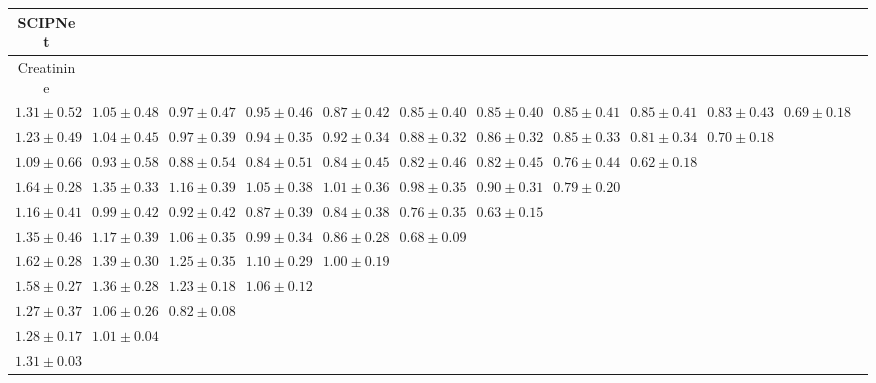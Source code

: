 \begin{table}[ht]
{{\begin{adjustbox}{width=\textwidth}
\begin{tabular}{cccccccccccc}
SCIPNet&  &  &  &  &  &  &  &  &  & \\
\hline
Creatinine &  &  &  &  &  &  &  &  &  & \\
\hline
$1.31 \pm 0.52$ & $1.05 \pm 0.48$ & $0.97 \pm 0.47$ & $0.95 \pm 0.46$ & $0.87 \pm 0.42$ & $0.85 \pm 0.40$ & $0.85 \pm 0.40$ & $0.85 \pm 0.41$ & $0.85 \pm 0.41$ & $0.83 \pm 0.43$ & $0.69 \pm 0.18$ &  \\
$1.23 \pm 0.49$ & $1.04 \pm 0.45$ & $0.97 \pm 0.39$ & $0.94 \pm 0.35$ & $0.92 \pm 0.34$ & $0.88 \pm 0.32$ & $0.86 \pm 0.32$ & $0.85 \pm 0.33$ & $0.81 \pm 0.34$ & $0.70 \pm 0.18$ &  &  \\
$1.09 \pm 0.66$ & $0.93 \pm 0.58$ & $0.88 \pm 0.54$ & $0.84 \pm 0.51$ & $0.84 \pm 0.45$ & $0.82 \pm 0.46$ & $0.82 \pm 0.45$ & $0.76 \pm 0.44$ & $0.62 \pm 0.18$ &  &  &  \\
$1.64 \pm 0.28$ & $1.35 \pm 0.33$ & $1.16 \pm 0.39$ & $1.05 \pm 0.38$ & $1.01 \pm 0.36$ & $0.98 \pm 0.35$ & $0.90 \pm 0.31$ & $0.79 \pm 0.20$ &  &  &  &  \\
$1.16 \pm 0.41$ & $0.99 \pm 0.42$ & $0.92 \pm 0.42$ & $0.87 \pm 0.39$ & $0.84 \pm 0.38$ & $0.76 \pm 0.35$ & $0.63 \pm 0.15$ &  &  &  &  &  \\
$1.35 \pm 0.46$ & $1.17 \pm 0.39$ & $1.06 \pm 0.35$ & $0.99 \pm 0.34$ & $0.86 \pm 0.28$ & $0.68 \pm 0.09$ &  &  &  &  &  &  \\
$1.62 \pm 0.28$ & $1.39 \pm 0.30$ & $1.25 \pm 0.35$ & $1.10 \pm 0.29$ & $1.00 \pm 0.19$ &  &  &  &  &  &  &  \\
$1.58 \pm 0.27$ & $1.36 \pm 0.28$ & $1.23 \pm 0.18$ & $1.06 \pm 0.12$ &  &  &  &  &  &  &  &  \\
$1.27 \pm 0.37$ & $1.06 \pm 0.26$ & $0.82 \pm 0.08$ &  &  &  &  &  &  &  &  &  \\
$1.28 \pm 0.17$ & $1.01 \pm 0.04$ &  &  &  &  &  &  &  &  &  &  \\
$1.31 \pm 0.03$ &  &  &  &  &  &  &  &  &  &  &  \\

\end{tabular}

\end{adjustbox}
}
}

\end{table}